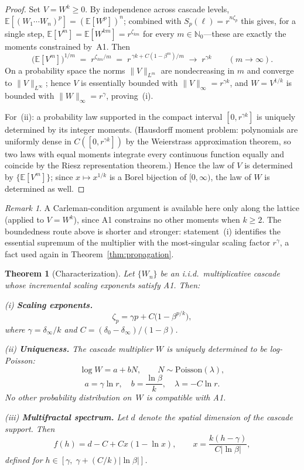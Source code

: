 \documentclass[12pt]{amsart}
\newtheorem{theorem}{Theorem}
\theoremstyle{definition}
\theoremstyle{remark}
\newtheorem*{remark}{Remark}
\begin{document}
\begin{proof}
Set $V = W^k \ge 0$.  By independence across cascade levels,
$\mathbb{E}[(W_1\cdots W_n)^p] = (\mathbb{E}[W^p])^n$; combined with
$S_p(\ell) = r^{n\zeta_p}$ this gives, for a single step,
$\mathbb{E}[V^m] = \mathbb{E}[W^{km}] = r^{\zeta_{km}}$ for every
$m \in \mathbb{N}_0$---these are exactly the moments constrained
by~A1.  Then
\[
  \bigl(\mathbb{E}[V^m]\bigr)^{1/m}
  \;=\; r^{\zeta_{km}/m}
  \;=\; r^{\,\gamma k + C(1-\beta^m)/m}
  \;\longrightarrow\; r^{\gamma k}
  \qquad (m \to \infty).
\]
On a probability space the norms $\|V\|_{L^m}$ are nondecreasing in
$m$ and converge to $\|V\|_{L^\infty}$; hence $V$ is essentially
bounded with $\|V\|_\infty = r^{\gamma k}$, and $W = V^{1/k}$ is
bounded with $\|W\|_\infty = r^{\gamma}$, proving~(i).

For~(ii): a probability law supported in the compact interval
$[0, r^{\gamma k}]$ is uniquely determined by its integer moments.
(Hausdorff moment problem: polynomials are uniformly dense in
$C([0,r^{\gamma k}])$ by the Weierstrass approximation theorem, so
two laws with equal moments integrate every continuous function
equally and coincide by the Riesz representation theorem.)  Hence
the law of $V$ is determined by $\{\mathbb{E}[V^m]\}$; since
$x \mapsto x^{1/k}$ is a Borel bijection of $[0,\infty)$, the law of
$W$ is determined as well.
\end{proof}

\begin{remark}
A Carleman-condition argument \cite{Akh65} is available here only
along the lattice (applied to $V = W^k$), since A1 constrains no
other moments when $k \ge 2$.  The boundedness route above is
shorter and stronger: statement~(i) identifies the essential
supremum of the multiplier with the most-singular scaling factor
$r^\gamma$, a fact used again in Theorem~\ref{thm:propagation}.
\end{remark}


\begin{theorem}[Characterization]\label{thm:characterization}
Let $\{W_n\}$ be an i.i.d.\ multiplicative cascade whose incremental
scaling exponents satisfy A1.  Then:

\textup{(i)} \textbf{Scaling exponents.}
\[
  \zeta_p = \gamma p + C\bigl(1 - \beta^{p/k}\bigr),
\]
where $\gamma = \delta_\infty/k$ and $C = (\delta_0 -
\delta_\infty)/(1-\beta)$.

\textup{(ii)} \textbf{Uniqueness.}  The cascade multiplier $W$ is
uniquely determined to be log-Poisson:
\[
  \log W = a + bN, \qquad N \sim \mathrm{Poisson}(\lambda),
\]
\[
  a = \gamma \ln r, \quad
  b = \frac{\ln\beta}{k}, \quad
  \lambda = -C\ln r.
\]
No other probability distribution on~$W$ is compatible with A1.

\textup{(iii)} \textbf{Multifractal spectrum.}  Let $d$ denote the
spatial dimension of the cascade support.  Then
\[
  f(h) = d - C + Cx(1 - \ln x),
  \qquad
  x = \frac{k(h - \gamma)}{C|\ln\beta|},
\]
defined for $h \in [\gamma,\; \gamma + (C/k)|\ln\beta|]$.
\end{theorem}
\end{document}
